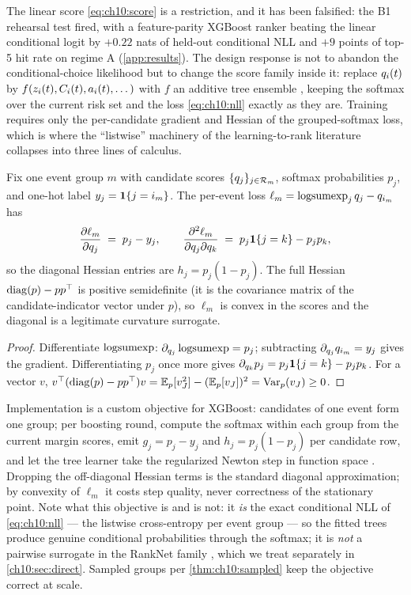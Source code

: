 The linear score \cref{eq:ch10:score} is a restriction, and it has been
falsified: the B1 rehearsal test fired, with a feature-parity XGBoost
ranker beating the linear conditional logit by $+0.22$ nats of held-out
conditional NLL and $+9$ points of top-5 hit rate on regime A
(\cref{app:results}). The design response is not to abandon the
conditional-choice likelihood but to change the score family inside it:
replace $q_i(t)$ by $f(z_i(t), C_i(t), a_i(t), \dots)$
with $f$ an additive tree ensemble \citep{friedman2001,chenguestrin2016},
keeping the softmax over the current risk set and the loss
\cref{eq:ch10:nll} exactly as they are. Training requires only the
per-candidate gradient and Hessian of the grouped-softmax loss, which is
where the ``listwise'' machinery of the learning-to-rank literature
collapses into three lines of calculus.

\begin{lemma}\label{lem:ch10:gradhess}
Fix one event group $m$ with candidate scores $\{q_j\}_{j \in
\mathcal{R}_m}$, softmax probabilities $p_j$, and one-hot label $y_j =
\mathbf{1}\{j = i_m\}$. The per-event loss $\ell_m = \operatorname{logsumexp}_j q_j -
q_{i_m}$ has
\begin{equation}\label{eq:ch10:gradhess}
\frac{\partial \ell_m}{\partial q_j} \;=\; p_j - y_j,
\qquad
\frac{\partial^2 \ell_m}{\partial q_j \partial q_k}
 \;=\; p_j \mathbf{1}\{j = k\} - p_j p_k,
\end{equation}
so the diagonal Hessian entries are $h_j = p_j(1 - p_j)$. The full
Hessian $\operatorname{diag}(p) - p p^{\top}$ is positive semidefinite (it is the
covariance matrix of the candidate-indicator vector under $p$), so
$\ell_m$ is convex in the scores and the diagonal is a legitimate
curvature surrogate.
\end{lemma}

\begin{proof}
Differentiate $\operatorname{logsumexp}$: $\partial_{q_j} \operatorname{logsumexp} = p_j$;
subtracting $\partial_{q_j} q_{i_m} = y_j$ gives the gradient.
Differentiating $p_j$ once more gives $\partial_{q_k} p_j = p_j
\mathbf{1}\{j=k\} - p_j p_k$. For a vector $v$, $v^{\top}(\operatorname{diag}(p) - pp^{\top})v = \mathbb{E}_p[v_J^2]
- (\mathbb{E}_p[v_J])^2 = \operatorname{Var}_p(v_J) \ge 0$.
\end{proof}

Implementation is a custom objective for XGBoost: candidates of one event
form one group; per boosting round, compute the softmax within each group
from the current margin scores, emit $g_j = p_j - y_j$ and $h_j = p_j(1 -
p_j)$ per candidate row, and let the tree learner take the regularized
Newton step in function space \citep{chenguestrin2016}. Dropping the
off-diagonal Hessian terms is the standard diagonal approximation; by
convexity of $\ell_m$ it costs step quality, never correctness of the
stationary point. Note what this objective is and is not: it \emph{is}
the exact conditional NLL of \cref{eq:ch10:nll} --- the listwise
cross-entropy per event group --- so the fitted trees produce genuine
conditional probabilities through the softmax; it is \emph{not} a
pairwise surrogate in the RankNet family \citep{burges2005}, which we
treat separately in \cref{ch10:sec:direct}. Sampled groups per
\cref{thm:ch10:sampled} keep the objective correct at scale.

